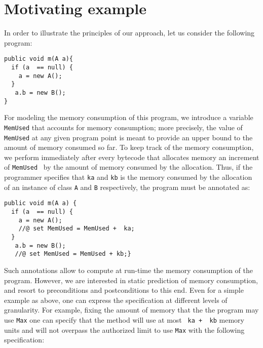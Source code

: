 \section{Motivating example}\label{sec:motivation}

In order to illustrate the principles of our approach, let us consider
the following program:

\begin{lstlisting}[frame=trbl] 
public void m(A a){
  if (a  == null) {
    a = new A();
  }  
   a.b = new B();
}
\end{lstlisting}

For modeling the memory consumption of this program, we introduce
a \ghost{}  variable \lstinline!MemUsed! that accounts for memory consumption; more
precisely, the value of \lstinline!MemUsed! at any given program point is meant
to provide an upper bound to the amount of memory consumed so far. To
keep track of the memory consumption, we perform immediately after every 
bytecode that allocates memory an increment of \lstinline!MemUsed! \ by the amount
of memory consumed by the allocation. Thus, if the programmer specifies
that \lstinline!ka! and \lstinline!kb! is the memory consumed by the allocation of 
an instance of class \lstinline!A! and  \lstinline!B! respectively, the program must
be annotated as:
\begin{lstlisting}[frame=trbl] 
public void m(A a) {
  if (a  == null) {
    a = new A();
    //@ set MemUsed = MemUsed +  ka;
  }  
   a.b = new B();
   //@ set MemUsed = MemUsed + kb;}
\end{lstlisting}

Such annotations allow to compute at run-time the memory consumption of 
the program. However, we are interested in static prediction of memory
consumption, and resort to preconditions and postconditions to this end.
Even for a simple example as above, one can express the specification
at different levels of granularity. For example, fixing the amount of memory that
the the program may use \lstinline!Max! one can specify that the method will use at most 
\lstinline! ka +  kb! memory units and will not overpass the authorized limit to use \lstinline!Max! with the following specification:

